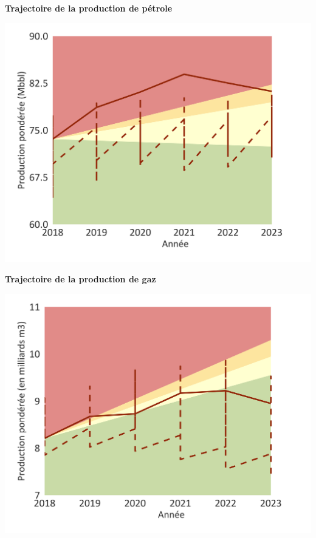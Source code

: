 \documentclass[10pt,table,a4]{article}\usepackage[]{graphicx}\usepackage[]{color}
\begin{document}
	\begin{minipage}[t]{.49\linewidth}
	\begin{center}
		\textbf{Trajectoire de la production de pétrole }
	\end{center}
		\includegraphics[trim = {0 0cm 0 0},width=1\linewidth]{ReportOutputs/Fig21}
		
	\end{minipage}	
	\hspace{.02\linewidth}
	\begin{minipage}[t]{.49\textwidth}
	\begin{center}
		\textbf{Trajectoire de la production de gaz }
	\end{center}
		\includegraphics[trim = {0 0cm 0 0},width=1\linewidth]{ReportOutputs/Fig22}
		
	\end{minipage}
	
\end{document}
